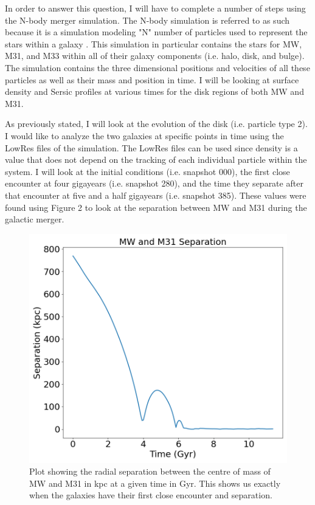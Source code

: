 \documentclass[linenumbers,trackchanges,twocolumn]{aastex7}
\begin{document}
In order to answer this question, I will have to complete a number of
steps using the N-body merger simulation. The N-body simulation is
referred to as such because it is a simulation modeling "N" number of
particles used to represent the stars within a galaxy
\citep{van_der_Marel_Besla_Cox_Sohn_Anderson_2012}. This simulation in
particular contains the stars for MW, M31, and M33 within all of their
galaxy components (i.e. halo, disk, and bulge). The simulation
contains the three dimensional positions and velocities of all these
particles as well as their mass and position in time. I will be
looking at surface density and Sersic profiles at various times for
the disk regions of both MW and M31.

As previously stated, I will look at the evolution of the disk
(i.e. particle type 2). I would
like to analyze the two galaxies at specific points in time using the
LowRes files of the simulation. The LowRes files can be used since
density is a value that does not depend on the tracking of each
individual particle within the system. I will look at the initial
conditions (i.e. snapshot 000), the first close encounter at four
gigayears (i.e. snapshot 280), and the time they separate after that
encounter at five and a half gigayears (i.e. snapshot 385). These
values were found using Figure 2 to look at the separation between MW
and M31 during the galactic merger.

\begin{figure}[h!]
\centering
\includegraphics[scale=0.35]{MWM31RS.png}
\caption{Plot showing the radial separation between the centre of mass of MW and M31 in kpc at a given time in Gyr. This shows us exactly when the galaxies have their first close encounter and separation.
\label{fig:general}}
\end{figure}
\end{document}
